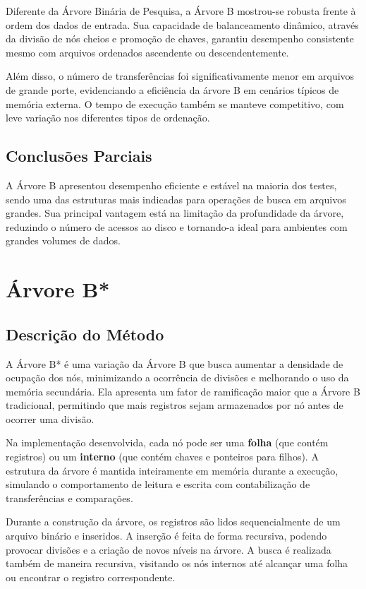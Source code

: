 \documentclass[12pt,a4paper,brazil]{article}
\begin{document}
Diferente da Árvore Binária de Pesquisa, a Árvore B mostrou-se robusta frente à ordem dos dados de entrada. Sua capacidade de balanceamento dinâmico, através da divisão de nós cheios e promoção de chaves, garantiu desempenho consistente mesmo com arquivos ordenados ascendente ou descendentemente.

Além disso, o número de transferências foi significativamente menor em arquivos de grande porte, evidenciando a eficiência da árvore B em cenários típicos de memória externa. O tempo de execução também se manteve competitivo, com leve variação nos diferentes tipos de ordenação.

\subsection{Conclusões Parciais}

A Árvore B apresentou desempenho eficiente e estável na maioria dos testes, sendo uma das estruturas mais indicadas para operações de busca em arquivos grandes. Sua principal vantagem está na limitação da profundidade da árvore, reduzindo o número de acessos ao disco e tornando-a ideal para ambientes com grandes volumes de dados.

\section{Árvore B*}

\subsection{Descrição do Método}

A Árvore B* é uma variação da Árvore B que busca aumentar a densidade de ocupação dos nós, minimizando a ocorrência de divisões e melhorando o uso da memória secundária. Ela apresenta um fator de ramificação maior que a Árvore B tradicional, permitindo que mais registros sejam armazenados por nó antes de ocorrer uma divisão.

Na implementação desenvolvida, cada nó pode ser uma \textbf{folha} (que contém registros) ou um \textbf{interno} (que contém chaves e ponteiros para filhos). A estrutura da árvore é mantida inteiramente em memória durante a execução, simulando o comportamento de leitura e escrita com contabilização de transferências e comparações. 

Durante a construção da árvore, os registros são lidos sequencialmente de um arquivo binário e inseridos. A inserção é feita de forma recursiva, podendo provocar divisões e a criação de novos níveis na árvore. A busca é realizada também de maneira recursiva, visitando os nós internos até alcançar uma folha ou encontrar o registro correspondente.
\end{document}
